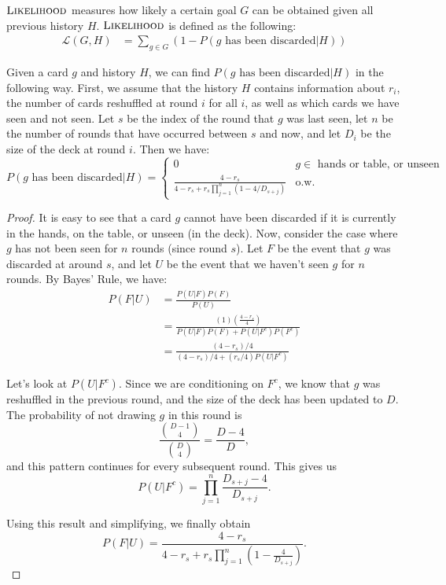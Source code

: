 \documentclass[11pt]{article}
\newcommand{\lkhd}{\textsc{Likelihood}}
\begin{document}
$\lkhd$ measures how likely a certain goal $G$ can be obtained given all previous history $H$. $\lkhd$ is defined as the following:
\begin{align}
  \mathcal{L}(G,H) &= \sum_{g \in G} (1 - P(g \text{ has been discarded}|H))
\end{align}

Given a card $g$ and history $H$, we can find $P(g \text{ has been discarded}|H)$ in the following way. First, we assume that the history $H$ contains information about $r_i$, the number of cards reshuffled at round $i$ for all $i$, as well as which cards we have seen and not seen. Let $s$ be the index of the round that $g$ was last seen, let $n$ be the number of rounds that have occurred between $s$ and now, and let $D_i$ be the size of the deck at round $i$. Then we have:
\begin{equation}
P(g \text{ has been discarded}|H) = \begin{cases}
  0 & g \in \text{ hands or table, or unseen} \\
  \frac{4-r_s}{4-r_s+r_s\prod_{j=1}^n(1-4/{D_{s+j}})} & \text{o.w.}
\end{cases}
\label{eq:p-discarded} \end{equation}

\begin{proof}
  It is easy to see that a card $g$ cannot have been discarded if it is currently in the hands, on the table, or unseen (in the deck). Now, consider the case where $g$ has not been seen for $n$ rounds (since round $s$). Let $F$ be the event that $g$ was discarded at around $s$, and let $U$ be the event that we haven't seen $g$ for $n$ rounds. By Bayes' Rule, we have:
\begin{align}
  P(F|U) &= \frac{P(U|F)P(F)}{P(U)} \\
  &= \frac{(1)\left(\frac{4-r_s}{4}\right)}{P(U|F)P(F) + P(U|F^c)P(F^c)} \\
  &= \frac{(4-r_s)/4}{(4-r_s)/4 + (r_s/4)P(U|F^c)}
\end{align}

Let's look at $P(U|F^c)$. Since we are conditioning on $F^c$, we know that $g$ was reshuffled in the previous round, and the size of the deck has been updated to $D$. The probability of not drawing $g$ in this round is
\begin{equation}
  \frac{{D-1 \choose 4}}{{D \choose 4}} = \frac{D-4}{D},
\end{equation} and this pattern continues for every subsequent round. This gives us
\begin{equation}
  P(U|F^c) = \prod_{j=1}^n \frac{D_{s+j} - 4}{D_{s+j}}.
\end{equation}

Using this result and simplifying, we finally obtain
\begin{equation}
  P(F|U) = \frac{4-r_s}{4-r_s+r_s\prod_{j=1}^n(1-\frac{4}{{D_{s+j}}})}.
\end{equation}
\end{proof}
\end{document}
